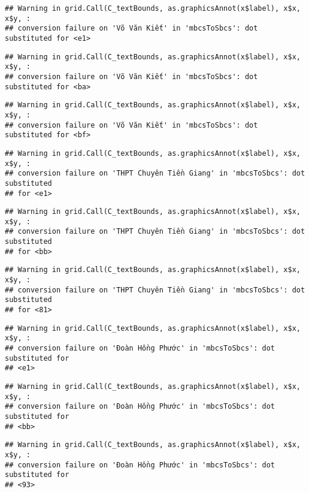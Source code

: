 \documentclass[
]{article}
\begin{document}
\begin{verbatim}
## Warning in grid.Call(C_textBounds, as.graphicsAnnot(x$label), x$x, x$y, :
## conversion failure on 'Võ Văn Kiết' in 'mbcsToSbcs': dot substituted for <e1>
\end{verbatim}

\begin{verbatim}
## Warning in grid.Call(C_textBounds, as.graphicsAnnot(x$label), x$x, x$y, :
## conversion failure on 'Võ Văn Kiết' in 'mbcsToSbcs': dot substituted for <ba>
\end{verbatim}

\begin{verbatim}
## Warning in grid.Call(C_textBounds, as.graphicsAnnot(x$label), x$x, x$y, :
## conversion failure on 'Võ Văn Kiết' in 'mbcsToSbcs': dot substituted for <bf>
\end{verbatim}

\begin{verbatim}
## Warning in grid.Call(C_textBounds, as.graphicsAnnot(x$label), x$x, x$y, :
## conversion failure on 'THPT Chuyên Tiền Giang' in 'mbcsToSbcs': dot substituted
## for <e1>
\end{verbatim}

\begin{verbatim}
## Warning in grid.Call(C_textBounds, as.graphicsAnnot(x$label), x$x, x$y, :
## conversion failure on 'THPT Chuyên Tiền Giang' in 'mbcsToSbcs': dot substituted
## for <bb>
\end{verbatim}

\begin{verbatim}
## Warning in grid.Call(C_textBounds, as.graphicsAnnot(x$label), x$x, x$y, :
## conversion failure on 'THPT Chuyên Tiền Giang' in 'mbcsToSbcs': dot substituted
## for <81>
\end{verbatim}

\begin{verbatim}
## Warning in grid.Call(C_textBounds, as.graphicsAnnot(x$label), x$x, x$y, :
## conversion failure on 'Đoàn Hồng Phước' in 'mbcsToSbcs': dot substituted for
## <e1>
\end{verbatim}

\begin{verbatim}
## Warning in grid.Call(C_textBounds, as.graphicsAnnot(x$label), x$x, x$y, :
## conversion failure on 'Đoàn Hồng Phước' in 'mbcsToSbcs': dot substituted for
## <bb>
\end{verbatim}

\begin{verbatim}
## Warning in grid.Call(C_textBounds, as.graphicsAnnot(x$label), x$x, x$y, :
## conversion failure on 'Đoàn Hồng Phước' in 'mbcsToSbcs': dot substituted for
## <93>
\end{verbatim}
\end{document}
